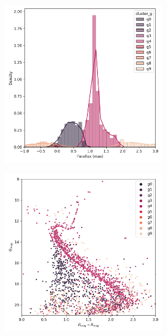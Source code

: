 \documentclass[11pt,a4paper,english,twocolumn]{article}
\begin{document}
\begin{figure}[htbp]
\begin{subfigure}{\columnwidth}
\begin{subfigure}[t]{0.30\textwidth}
    \end{subfigure}
    \hfill
    \begin{subfigure}[t]{0.30\textwidth}
      \centering
      \includegraphics[width=\textwidth]{../figures/ngc_2682/kmeans_parallax_ngc_2682.png}
    \end{subfigure}
    \hfill
    \begin{subfigure}[t]{0.30\textwidth}
      \centering
      \includegraphics[width=\textwidth]{../figures/ngc_2682/kmeans_hr_diagram_ngc_2682.png}

\end{subfigure}
\end{subfigure}
\end{figure}
\end{document}
